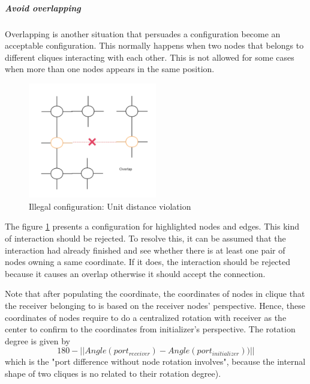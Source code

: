 \subparagraph{Avoid overlapping}\noindent
Overlapping is another situation that persuades a configuration become an acceptable
configuration. This normally happens when two nodes that belongs to different cliques
interacting with each other. This is not allowed for some cases when more than one nodes
appears in the same position.
\begin{figure}[H]
\begin{center}
\includegraphics[width = 0.5\textwidth]{context/diagram/overlap.pdf}
\caption{Illegal configuration: Unit distance violation}
\label{overlap}
\end{center}
\end{figure}
\par\noindent
The figure \ref{overlap} presents a configuration for highlighted nodes and edges.
This kind of interaction should be rejected. To resolve this, it can be assumed that
the interaction had already finished and see whether there is at least one pair of nodes
owning a same coordinate. If it does, the interaction should be rejected because it causes
an overlap otherwise it should accept the connection.

\par\noindent
Note that after populating the coordinate, the coordinates of nodes in clique that the receiver belonging to
is based on the receiver nodes' perspective. Hence, these coordinates of nodes require to do a centralized rotation with receiver as the center to
confirm to the coordinates from initializer's perspective. The rotation degree is given by
$$180 - ||Angle(port_{receiver}) - Angle(port_{initializer}))||$$ which is the "port difference without node rotation involves", because the internal
shape of two cliques is no related to their rotation degree).

